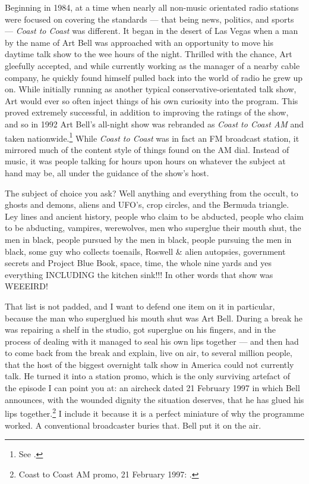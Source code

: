 Beginning in 1984, at a time when nearly all non-music orientated radio stations were focused on
covering the standards --- that being news, politics, and sports --- \emph{Coast to Coast} was
different. It began in the desert of Las Vegas when a man by the name of Art Bell was approached with
an opportunity to move his daytime talk show to the wee hours of the night. Thrilled with the chance,
Art gleefully accepted, and while currently working as the manager of a nearby cable company, he
quickly found himself pulled back into the world of radio he grew up on. While initially running as
another typical conservative-orientated talk show, Art would ever so often inject things of his own
curiosity into the program. This proved extremely successful, in addition to improving the ratings of
the show, and so in 1992 Art Bell's all-night show was rebranded as \emph{Coast to Coast AM} and taken
nationwide.\footnote{See .} While \emph{Coast to
Coast} was in fact an FM broadcast station, it mirrored much of the content style of things found on
the AM dial. Instead of music, it was people talking for hours upon hours on whatever the subject at
hand may be, all under the guidance of the show's host.

The subject of choice you ask? Well anything and everything from the occult, to ghosts and demons,
aliens and UFO's, crop circles, and the Bermuda triangle. Ley lines and ancient history, people who
claim to be abducted, people who claim to be abducting, vampires, werewolves, men who superglue
their mouth shut, the men in black, people pursued by the men in black, people pursuing the men in
black, some guy who collects toenails, Roswell \& alien autopsies, government secrets and Project
Blue Book, space, time, the whole nine yards and yes everything INCLUDING the kitchen sink!!! In
other words that show was WEEEIRD!

\begin{funfact}
That list is not padded, and I want to defend one item on it in particular, because the man
who superglued his mouth shut was Art Bell. During a break he was repairing a shelf in the
studio, got superglue on his fingers, and in the process of dealing with it managed to
seal his own lips together --- and then had to come back from the break and explain, live on
air, to several million people, that the host of the biggest overnight talk show in America
could not currently talk. He turned it into a station promo, which is the only surviving
artefact of the episode I can point you at: an aircheck dated 21 February 1997 in which Bell
announces, with the wounded dignity the situation deserves, that he has glued his lips
together.\footnote{Coast to Coast AM promo, 21 February 1997:
.}
I include it because it is a perfect miniature of why the programme worked. A conventional
broadcaster buries that. Bell put it on the air.
\end{funfact}

